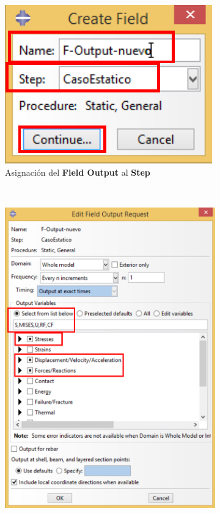 \begin{enumerate}
\begin{figure}[H]
\begin{subfigure}{0.33\textwidth}
      \includegraphics[width=\textwidth]{./body/images/imagen32.pdf}
      \caption{Asignación del \textbf{Field Output} al \textbf{Step}}
      \label{figu32}
    \end{subfigure}%
    ~ %
    \begin{subfigure}{0.40\textwidth}
      \includegraphics[width=\textwidth]{./body/images/imagen33.pdf}

\end{subfigure}
\end{figure}
\end{enumerate}
